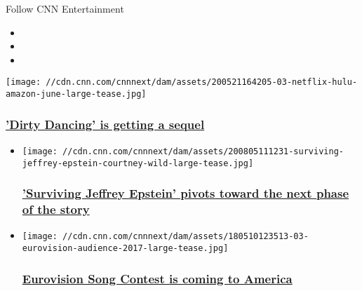 Follow CNN Entertainment

\begin{itemize}
\item
\item
\item
\end{itemize}

\href{/2020/08/07/entertainment/dirty-dancing-sequel-trnd/index.html}{}

\texttt{[image: //cdn.cnn.com/cnnnext/dam/assets/200521164205-03-netflix-hulu-amazon-june-large-tease.jpg]}

\hypertarget{dirty-dancing-is-getting-a-sequel}{%
\subsubsection{\texorpdfstring{\href{/2020/08/07/entertainment/dirty-dancing-sequel-trnd/index.html}{'Dirty
Dancing' is getting a
sequel}}{'Dirty Dancing' is getting a sequel}}\label{dirty-dancing-is-getting-a-sequel}}

\begin{itemize}
\item
  \href{/2020/08/07/entertainment/surviving-jeffrey-epstein-review/index.html}{}

  \texttt{[image: //cdn.cnn.com/cnnnext/dam/assets/200805111231-surviving-jeffrey-epstein-courtney-wild-large-tease.jpg]}

  \hypertarget{surviving-jeffrey-epstein-pivots-toward-the-next-phase-of-the-story}{%
  \subsubsection{\texorpdfstring{\href{/2020/08/07/entertainment/surviving-jeffrey-epstein-review/index.html}{'Surviving
  Jeffrey Epstein' pivots toward the next phase of the
  story}}{'Surviving Jeffrey Epstein' pivots toward the next phase of the story}}\label{surviving-jeffrey-epstein-pivots-toward-the-next-phase-of-the-story}}
\end{itemize}

\begin{itemize}
\item
  \href{/2020/08/07/entertainment/eurovision-american-song-contest/index.html}{}

  \texttt{[image: //cdn.cnn.com/cnnnext/dam/assets/180510123513-03-eurovision-audience-2017-large-tease.jpg]}

  \hypertarget{eurovision-song-contest-is-coming-to-america}{%
  \subsubsection{\texorpdfstring{\href{/2020/08/07/entertainment/eurovision-american-song-contest/index.html}{Eurovision
  Song Contest is coming to
  America}}{Eurovision Song Contest is coming to America}}\label{eurovision-song-contest-is-coming-to-america}}
\end{itemize}

